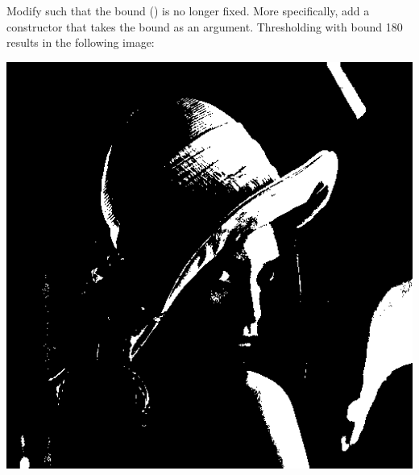 \documentclass{book}
\begin{document}
\begin{exercise}
Modify  such that the bound () is no longer fixed. More specifically, add a constructor that takes the bound as an argument. Thresholding  with bound 180 results in the following image:
\begin{center}
\includegraphics[scale=0.10]{lena-binary-bound-180.png}
\end{center}
\end{exercise}
\end{document}
